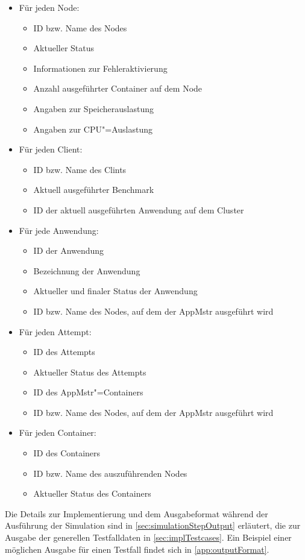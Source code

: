 \begin{itemize}
    \item Für jeden Node:
    \begin{itemize}
        \item ID bzw. Name des Nodes
        \item Aktueller Status
        \item Informationen zur Fehleraktivierung
        \item Anzahl ausgeführter Container auf dem Node
        \item Angaben zur Speicherauslastung
        \item Angaben zur CPU"=Auslastung
    \end{itemize}
    
    \item Für jeden Client:
    \begin{itemize}
        \item ID bzw. Name des Clints
        \item Aktuell ausgeführter Benchmark
        \item ID der aktuell ausgeführten Anwendung auf dem Cluster
    \end{itemize}

    \item Für jede Anwendung:
    \begin{itemize}
        \item ID der Anwendung
        \item Bezeichnung der Anwendung
        \item Aktueller und finaler Status der Anwendung
        \item ID bzw. Name des Nodes, auf dem der \ac{AppMstr} ausgeführt wird
    \end{itemize}

    \item Für jeden Attempt:
    \begin{itemize}
        \item ID des Attempts
        \item Aktueller Status des Attempts
        \item ID des \ac{AppMstr}"=Containers
        \item ID bzw. Name des Nodes, auf dem der \ac{AppMstr} ausgeführt wird
    \end{itemize}

    \item Für jeden Container:
    \begin{itemize}
        \item ID des Containers
        \item ID bzw. Name des auszuführenden Nodes
        \item Aktueller Status des Containers
    \end{itemize}
\end{itemize}

Die Details zur Implementierung und dem Ausgabeformat während der Ausführung der Simulation sind in \autoref{sec:simulationStepOutput} erläutert, die zur Ausgabe der generellen Testfalldaten in \autoref{sec:implTestcases}. Ein Beispiel einer möglichen Ausgabe für einen Testfall findet sich in \autoref{app:outputFormat}.

